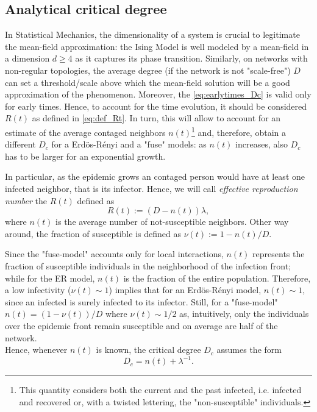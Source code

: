 \documentclass[a4paper,10pt,twoside]{book} %
\theoremstyle{definition}
\begin{document}
\subsection*{Analytical critical degree}
In Statistical Mechanics, the dimensionality of a system is crucial to legitimate the mean-field approximation: the Ising Model is well modeled by a mean-field in a dimension $d \geq 4$ as it captures its phase transition. Similarly, on networks with non-regular topologies, the average degree (if the network is not "scale-free") $D$ can set a threshold/scale above which the mean-field solution will be a good approximation of the phenomenon. Moreover, the \autoref{eq:earlytimes_Dc} is valid only for early times. Hence, to account for the time evolution, it should be considered $R(t)$ as defined in \autoref{eq:def_Rt}. In turn, this will allow to account for an estimate of the average contaged neighbors $n(t)$\footnote{This quantity considers both the current and the past infected, i.e. infected and recovered or, with a twisted lettering, the "non-susceptible" individuals.}  and, therefore, obtain a different $D_c$ for a Erdös-Rényi and a "fuse" models: as $n(t)$ increases, also $ D_c$ has to be larger for an exponential growth.


In particular, as the epidemic grows an contaged person would have at least one infected neighbor, that is its infector. Hence, we will call \textit{effective reproduction number} the $R(t)$ defined as \cite{Thurner::Appendix_NetBasedExpl}
\begin{equation}
	R(t) := (D-n(t))\lambda,
	\label{eq:def_Rt}
\end{equation}
where $n(t)$ is the average number of not-susceptible neighbors. 
Other way around, the fraction of susceptible is defined as $\nu(t) := 1 - n(t)/D$. 

Since the "fuse-model" accounts only for local interactions, $n(t)$ represents the fraction of susceptible individuals in the neighborhood of the infection front; while for the ER model, $n(t)$ is the fraction of the entire population. Therefore, a low infectivity ($\nu(t)\sim1$) implies that for an Erdös-Rényi model, $n(t) \sim 1$, since an infected is surely infected to its infector. Still, for a "fuse-model" $n(t) = (1-\nu(t))/D$ where $ \nu(t)\sim 1/2$ as, intuitively, only the individuals over the epidemic front remain susceptible and on average are half of the network.
\\Hence, whenever $n(t)$ is known, the critical degree $ D_c$ assumes the form
\begin{equation}
	D_c = n(t) + \lambda^{-1}.
	\label{eq:D_c_analytical_discussion}
\end{equation}   
\end{document}
